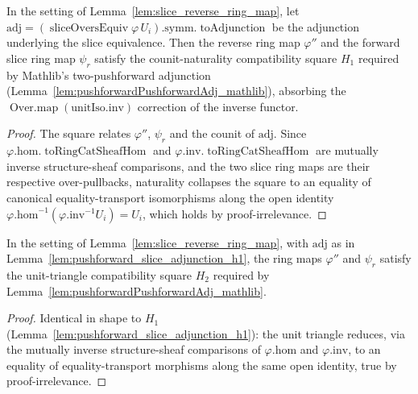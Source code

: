 \begin{lemma}\leanok
  \label{lem:pushforward_slice_adjunction_h1}
  In the setting of Lemma~\ref{lem:slice_reverse_ring_map}, let \(\mathrm{adj} =
  (\operatorname{sliceOversEquiv}\varphi\,U_i).\mathrm{symm}.\operatorname{toAdjunction}\) be the
  adjunction underlying the slice equivalence. Then the reverse ring map \(\varphi''\) and the forward
  slice ring map \(\psi_r\) satisfy the counit-naturality compatibility square \(H_1\) required by
  Mathlib's two-pushforward adjunction (Lemma~\ref{lem:pushforwardPushforwardAdj_mathlib}), absorbing
  the \(\operatorname{Over.map}(\mathrm{unitIso}.\mathrm{inv})\) correction of the inverse functor.
\end{lemma}
\begin{proof}
  \leanok
  The square relates \(\varphi''\), \(\psi_r\) and the counit of \(\mathrm{adj}\). Since
  \(\varphi.\mathrm{hom}.\operatorname{toRingCatSheafHom}\) and
  \(\varphi.\mathrm{inv}.\operatorname{toRingCatSheafHom}\) are mutually inverse structure-sheaf
  comparisons, and the two slice ring maps are their respective over-pullbacks, naturality collapses the
  square to an equality of canonical equality-transport isomorphisms along the open identity
  \(\varphi.\mathrm{hom}^{-1}(\varphi.\mathrm{inv}^{-1} U_i) = U_i\), which holds by
  proof-irrelevance.
\end{proof}

\begin{lemma}\leanok
  \label{lem:pushforward_slice_adjunction_h2}
  In the setting of Lemma~\ref{lem:slice_reverse_ring_map}, with \(\mathrm{adj}\) as in
  Lemma~\ref{lem:pushforward_slice_adjunction_h1}, the ring maps \(\varphi''\) and \(\psi_r\) satisfy
  the unit-triangle compatibility square \(H_2\) required by
  Lemma~\ref{lem:pushforwardPushforwardAdj_mathlib}.
\end{lemma}
\begin{proof}
  \leanok
  Identical in shape to \(H_1\) (Lemma~\ref{lem:pushforward_slice_adjunction_h1}): the unit triangle
  reduces, via the mutually inverse structure-sheaf comparisons of \(\varphi.\mathrm{hom}\) and
  \(\varphi.\mathrm{inv}\), to an equality of equality-transport morphisms along the same open identity,
  true by proof-irrelevance.
\end{proof}

